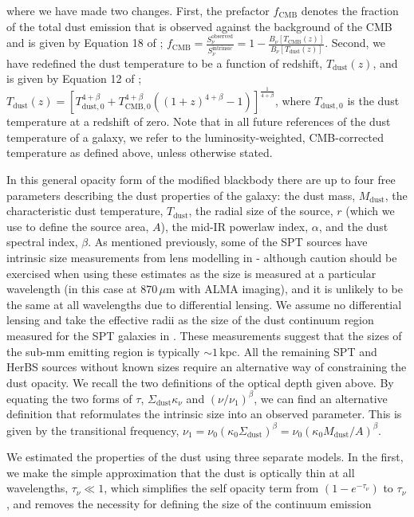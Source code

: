 \noindent where we have made two changes. First, the prefactor $f_{\textrm{CMB}}$ denotes the fraction of the total dust emission that is observed against the background of the CMB and is given by Equation 18 of \citealt{daCunha_2013}; $f_{\textrm{CMB}} = \frac{S_\nu^{\textrm{observed}}}{S_\nu^{\textrm{intrinsic}}} = 1 - \frac{B_\nu[T_{\textrm{CMB}}(z)]}{B_\nu[T_{\textrm{dust}}(z)]}$. Second, we have redefined the dust temperature to be a function of redshift, $T_{\textrm{dust}}(z)$, and is given by Equation 12 of \citealt{daCunha_2013}; $T_{\textrm{dust}}(z) = [T_{\textrm{dust}, 0}^{4+\beta} + T_{\textrm{CMB}, 0}^{4+\beta} ((1+z)^{4+\beta} - 1)]^{\frac{1}{4+\beta}}$, where $T_{\textrm{dust}, 0}$ is the dust temperature at a redshift of zero. Note that in all future references of the dust temperature of a galaxy, we refer to the luminosity-weighted, CMB-corrected temperature as defined above, unless otherwise stated.

In this general opacity form of the modified blackbody there are up to four free parameters describing the dust properties of the galaxy: the dust mass, $M_{\textrm{dust}}$, the characteristic dust temperature, $T_{\textrm{dust}}$, the radial size of the source, $r$ (which we use to define the source area, $A$), the mid-IR powerlaw index, $\alpha$, and the dust spectral index, $\beta$. As mentioned previously, some of the SPT sources have intrinsic size measurements from lens modelling in \citealt{Spilker_2016} - although caution should be exercised when using these estimates as the size is measured at a particular wavelength (in this case at $870\,\mu$m with ALMA imaging), and it is unlikely to be the same at all wavelengths due to differential lensing. We assume no differential lensing and take the effective radii as the size of the dust continuum region measured for the SPT galaxies in \citealt{Spilker_2016}. These measurements suggest that the sizes of the sub-mm emitting region is typically $\sim 1\,$kpc. All the remaining SPT and HerBS sources without known sizes require an alternative way of constraining the dust opacity. We recall the two definitions of the optical depth given above. By equating the two forms of $\tau$, $\Sigma_{\textrm{dust}}\kappa_\nu$  and $(\nu/\nu_1)^\beta$, we can find an alternative definition that reformulates the intrinsic size into an observed parameter. This is given by the transitional frequency, $\nu_1 = \nu_0 (\kappa_0\Sigma_{\textrm{dust}})^\beta = \nu_0 (\kappa_0M_{\textrm{dust}}/A)^\beta$.

We estimated the properties of the dust using three separate models. In the first, we make the simple approximation that the dust is optically thin at all wavelengths, $\tau_\nu \ll 1$, which simplifies the self opacity term from $(1 - e^{-\tau_\nu})$ to $\tau_\nu$, and removes the necessity for defining the size of the continuum emission

